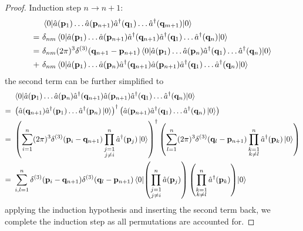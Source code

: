 \begin{proof}
	Induction step $n\to n+1$:
	\begin{equation*}
		\begin{split}
			&\
			\expval{
				\hat{a}(\vb{p}_1)
				\dots
				\hat{a}(\vb{p}_{n+1})
				\hat{a}^\dagger(\vb{q}_1)
				\dots
				\hat{a}^\dagger(\vb{q}_{m+1})
			}{0}
			\\
			=&\
			\delta_{nm}
			\expval{
				\hat{a}(\vb{p}_1)
				\dots
				\hat{a}(\vb{p}_{n+1})
				\hat{a}^\dagger(\vb{q}_{n+1})
				\hat{a}^\dagger(\vb{q}_1)
				\dots
				\hat{a}^\dagger(\vb{q}_n)
			}{0}
			\\
			=&\
			\delta_{nm}
			(2\pi)^3
			\delta^{(3)}(\vb{q}_{n+1}-\vb{p}_{n+1})
			\expval{
				\hat{a}(\vb{p}_1)
				\dots
				\hat{a}(\vb{p}_n)
				\hat{a}^\dagger(\vb{q}_1)
				\dots
				\hat{a}^\dagger(\vb{q}_n)
			}{0}
			\\
			+&\
			\delta_{nm}
			\expval{
				\hat{a}(\vb{p}_1)
				\dots
				\hat{a}(\vb{p}_n)
				\hat{a}^\dagger(\vb{q}_{n+1})
				\hat{a}(\vb{p}_{n+1})
				\hat{a}^\dagger(\vb{q}_1)
				\dots
				\hat{a}^\dagger(\vb{q}_n)
			}{0}
		\end{split}
	\end{equation*}
	the second term can be further simplified to
	\begin{equation*}
		\begin{split}
			&\
			\expval{
				\hat{a}(\vb{p}_1)
				\dots
				\hat{a}(\vb{p}_n)
				\hat{a}^\dagger(\vb{q}_{n+1})
				\hat{a}(\vb{p}_{n+1})
				\hat{a}^\dagger(\vb{q}_1)
				\dots
				\hat{a}^\dagger(\vb{q}_n)
			}{0}
			\\
			=&\
			\left(
				\hat{a}(\vb{q}_{n+1})
				\hat{a}^\dagger(\vb{p}_1)
				\dots
				\hat{a}^\dagger(\vb{p}_n)
				\ket{0}
			\right)^\dagger
			\left(
				\hat{a}(\vb{p}_{n+1})
				\hat{a}^\dagger(\vb{q}_1)
				\dots
				\hat{a}^\dagger(\vb{q}_n)
				\ket{0}
			\right)
			\\
			=&\
			\left(
				\sum^n_{i=1}
				(2\pi)^3
				\delta^{(3)}(\vb{p}_i-\vb{q}_{n+1})
				\prod_{\substack{j=1\\j\neq i}}^n
				\hat{a}^\dagger(\vb{p}_j)
				\ket{0}
			\right)^\dagger
			\left(
				\sum^n_{l=1}
				(2\pi)^3
				\delta^{(3)}(\vb{q}_l-\vb{p}_{n+1})
				\prod_{\substack{k=1\\k\neq l}}^n
				\hat{a}^\dagger(\vb{p}_k)
				\ket{0}
			\right)
			\\
			=&\
			\sum^n_{i,l=1}
			\delta^{(3)}(\vb{p}_i-\vb{q}_{n+1})
			\delta^{(3)}(\vb{q}_l-\vb{p}_{n+1})
			\expval{
				\left(
					\prod_{\substack{j=1\\j\neq i}}^n
					\hat{a}(\vb{p}_j)
				\right)
				\left(
					\prod_{\substack{k=1\\k\neq l}}^n
					\hat{a}^\dagger(\vb{p}_k)
				\right)
			}{0}
		\end{split}
	\end{equation*}
	applying the induction hypothesis and inserting the second term back, we complete the induction step as all permutations are accounted for.
\end{proof}
